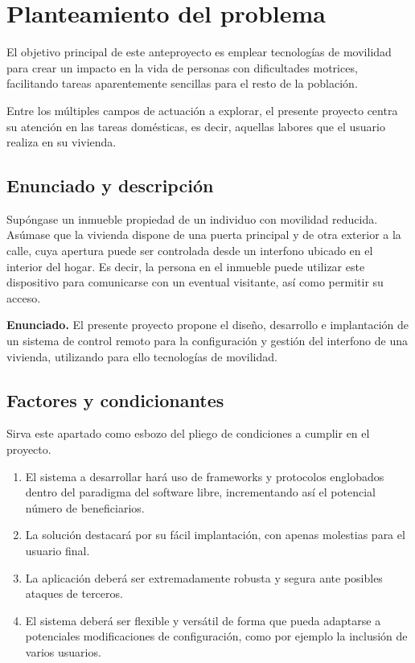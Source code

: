 \chapter{Planteamiento del problema}
\label{chap:planteamiento}
\onehalfspacing

El objetivo principal de este anteproyecto es emplear tecnologías de movilidad para crear un impacto en la vida de personas con dificultades motrices, facilitando tareas aparentemente sencillas para el resto de la población.

Entre los múltiples campos de actuación a explorar, el presente proyecto centra su atención en las tareas domésticas, es decir, aquellas labores que el usuario realiza en su vivienda.

\section{Enunciado y descripción}
\label{sec:enunciado&descripcion_dePlanteamiento}
Supóngase un inmueble propiedad de un individuo con movilidad reducida. Asúmase que la vivienda dispone de una puerta principal y de otra exterior a la calle, cuya apertura puede ser controlada desde un interfono ubicado en el interior del hogar. Es decir, la persona en el inmueble puede utilizar este dispositivo para comunicarse con un eventual visitante, así como permitir su acceso.

\textbf{Enunciado.} El presente proyecto propone el diseño, desarrollo e implantación de un sistema de control remoto para la configuración y gestión del interfono de una vivienda, utilizando para ello tecnologías de movilidad. 
 
\section{Factores y condicionantes}
\label{sec:factore&condicionantes_dePlanteamiento}
Sirva este apartado como esbozo del pliego de condiciones a cumplir en el proyecto.

\begin{enumerate}
	\item El sistema a desarrollar hará uso de frameworks y protocolos englobados dentro del paradigma del software libre, incrementando así el potencial número de beneficiarios.
	\item La solución destacará por su fácil implantación, con apenas molestias para el usuario final.
	\item La aplicación deberá ser extremadamente robusta y segura ante posibles ataques de terceros.
	\item El sistema deberá ser flexible y versátil de forma que pueda adaptarse a potenciales modificaciones de configuración, como por ejemplo la inclusión de varios usuarios.
\end{enumerate}


